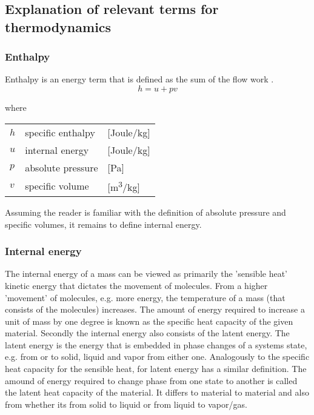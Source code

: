 \subsection{Explanation of relevant terms for thermodynamics}
\subsubsection{Enthalpy}
Enthalpy is an energy term that is defined as the sum of the flow work \cite{Koelet1992}. 
\begin{equation}
	h = u + pv
\end{equation}

where 
	\begin{center}
		\begin{tabular}{l p{3cm} l}
			
			$h$ & specific enthalpy & [\si{Joule}/\si{kg}]\\ 
			$u$ & internal energy & [\si{Joule}/\si{kg}]\\
			$p$ & absolute pressure & [\si{Pa}]\\
			$v$ & specific volume & [\si{m^3}/\si{kg}]
		\end{tabular}
	\end{center}

Assuming the reader is familiar with the definition of absolute pressure and specific volumes, it remains to define internal energy.

\subsubsection{Internal energy}
The internal energy of a mass can be viewed as primarily the 'sensible heat' kinetic energy that dictates the movement of molecules. From a higher 'movement' of molecules, e.g. more energy, the temperature of a mass (that consists of the molecules) increases. The amount of energy required to increase a unit of mass by one degree is known as the specific heat capacity of the given material.
Secondly the internal energy also consists of the latent energy. The latent energy is the energy that is embedded in phase changes of a systems state, e.g. from or to solid, liquid and vapor from either one. Analogously to the specific heat capacity for the sensible heat, for latent energy has a similar definition. The amound of energy required to change phase from one state to another is called the latent heat capacity of the material. It differs to material to material and also from whether its from solid to liquid or from liquid to vapor/gas. 

